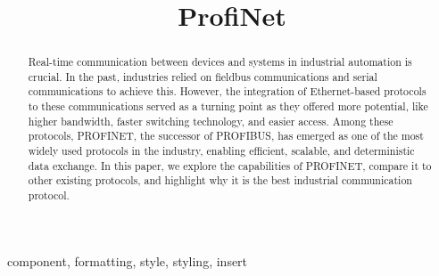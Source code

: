 \documentclass[conference]{IEEEtran}
\begin{document}
\title{ProfiNet\\}

\author{
\and
{}
\and
{}
}

\maketitle

\begin{abstract}
Real-time communication between devices and systems in industrial automation is crucial. In the past, industries relied on fieldbus communications and serial communications to achieve this. However, the integration of Ethernet-based protocols to these communications served as a turning point as they offered more potential, like higher bandwidth, faster switching technology, and easier access. Among these protocols, PROFINET, the successor of PROFIBUS, has emerged as one of the most widely used protocols in the industry, enabling efficient, scalable, and deterministic data exchange. In this paper, we explore the capabilities of PROFINET, compare it to other existing protocols, and highlight why it is the best industrial communication protocol.

\end{abstract}

\begin{IEEEkeywords}
component, formatting, style, styling, insert
\end{IEEEkeywords}
\end{document}

